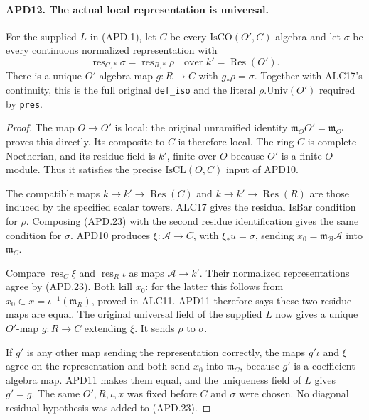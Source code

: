 \documentclass[11pt,a4paper]{article}
\numberwithin{equation}{section}
\theoremstyle{remark}\newtheorem{remark}[theorem]{Remark}
\begin{document}
\paragraph{APD12. The actual local representation is universal.}
\label{claim:APD12}
For the supplied \(L\) in (APD.1), let \(C\) be every
\(\mathrm{IsCO}(O',C)\)-algebra and let \(\sigma\) be every
continuous normalized representation with
\[
 \operatorname{res}_{C,*}\sigma
                     =\operatorname{res}_{R,*}\rho
                    \quad\text{over }k'=\operatorname{Res}(O').
                                                               \tag{APD.23}
\]
There is a unique \(O'\)-algebra map \(g:R\to C\) with
\(g_*\rho=\sigma\).  Together with ALC17's continuity,
this is the full original \texttt{def\_\allowbreak iso} and the literal
\(\rho.\mathrm{Univ}(O')\) required by \texttt{pres}.

\begin{proof}
The map \(O\to O'\) is local: the original unramified
identity \(\mathfrak m_OO'=\mathfrak m_{O'}\) proves this
directly.  Its composite to \(C\) is therefore local.
The ring \(C\) is complete Noetherian, and its residue field
is \(k'\), finite over \(O\) because \(O'\) is a finite
\(O\)-module.  Thus it satisfies the precise
\(\mathrm{IsCL}(O,C)\) input of APD10.

The compatible maps \(k\to k'\to\operatorname{Res}(C)\)
and \(k\to k'\to\operatorname{Res}(R)\) are those induced
by the specified scalar towers.  ALC17 gives the residual
\(\mathrm{IsBar}\) condition for \(\rho\).  Composing
(APD.23) with the second residue identification gives the same
condition for \(\sigma\).  APD10 produces
\(\xi:\mathcal A\to C\), with \(\xi_*u=\sigma\), sending
\(x_0=\mathfrak m_{\mathcal B}\mathcal A\) into
\(\mathfrak m_C\).

Compare \(\operatorname{res}_C\xi\) and
\(\operatorname{res}_R\iota\) as maps \(\mathcal A\to k'\).
Their normalized representations agree by (APD.23).  Both kill
\(x_0\): for the latter this follows from
\(x_0\subset x=\iota^{-1}(\mathfrak m_R)\), proved in
ALC11.  APD11 therefore says these two residue maps are equal.
The original universal field of the supplied \(L\) now gives
a unique \(O'\)-map \(g:R\to C\) extending \(\xi\).
It sends \(\rho\) to \(\sigma\).

If \(g'\) is any other map sending the representation correctly,
the maps \(g'\iota\) and \(\xi\) agree on the representation
and both send \(x_0\) into \(\mathfrak m_C\), because
\(g'\) is a coefficient-algebra map.  APD11 makes them equal,
and the uniqueness field of \(L\) gives \(g'=g\).
The same \(O',R,\iota,x\) was fixed before \(C\) and
\(\sigma\) were chosen.  No diagonal residual hypothesis was
added to (APD.23).
\end{proof}
\end{document}

